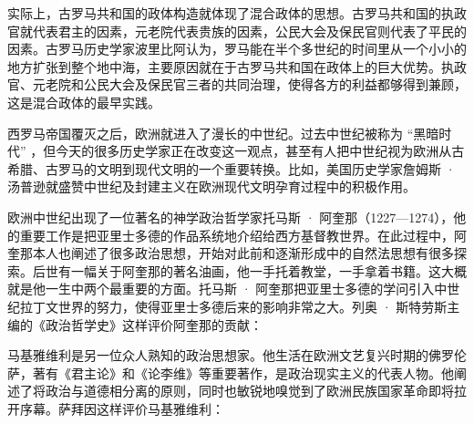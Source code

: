 实际上，古罗马共和国的政体构造就体现了混合政体的思想。古罗马共和国的执政官就代表君主的因素，元老院代表贵族的因素，公民大会及保民官则代表了平民的因素。古罗马历史学家波里比阿认为，罗马能在半个多世纪的时间里从一个小小的地方扩张到整个地中海，主要原因就在于古罗马共和国在政体上的巨大优势。执政官、元老院和公民大会及保民官三者的共同治理，使得各方的利益都够得到兼顾，这是混合政体的最早实践。


西罗马帝国覆灭之后，欧洲就进入了漫长的中世纪。过去中世纪被称为 “黑暗时代” ，但今天的很多历史学家正在改变这一观点，甚至有人把中世纪视为欧洲从古希腊、古罗马的文明到现代文明的一个重要转换。比如，美国历史学家詹姆斯 · 汤普逊就盛赞中世纪及封建主义在欧洲现代文明孕育过程中的积极作用。

欧洲中世纪出现了一位著名的神学政治哲学家托马斯 · 阿奎那（1227—1274），他的重要工作是把亚里士多德的作品系统地介绍给西方基督教世界。在此过程中，阿奎那本人也阐述了很多政治思想，开始对此前和逐渐形成中的自然法思想有很多探索。后世有一幅关于阿奎那的著名油画，他一手托着教堂，一手拿着书籍。这大概就是他一生中两个最重要的方面。托马斯 · 阿奎那把亚里士多德的学问引入中世纪拉丁文世界的努力，使得亚里士多德后来的影响非常之大。列奥 · 斯特劳斯主编的《政治哲学史》这样评价阿奎那的贡献：


马基雅维利是另一位众人熟知的政治思想家。他生活在欧洲文艺复兴时期的佛罗伦萨，著有《君主论》和《论李维》等重要著作，是政治现实主义的代表人物。他阐述了将政治与道德相分离的原则，同时也敏锐地嗅觉到了欧洲民族国家革命即将拉开序幕。萨拜因这样评价马基雅维利：


